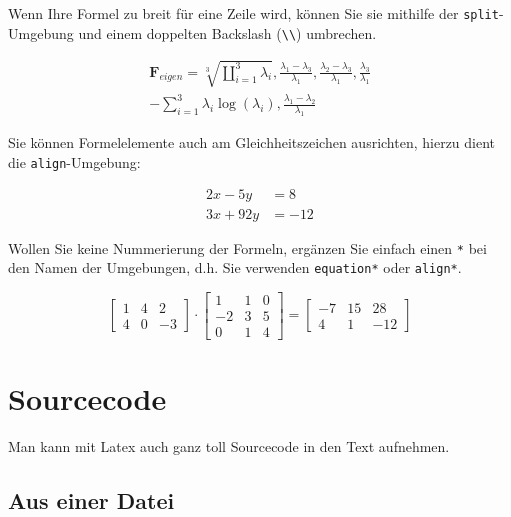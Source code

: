 Wenn Ihre Formel zu breit für eine Zeile wird, können Sie sie mithilfe der \texttt{split}-Umgebung und einem doppelten Backslash (\verb+\\+) umbrechen.

\begin{equation}
\label{eq:4}
\begin{split}
\mathbf{F}_{{eigen}}=\sqrt[3]{\coprod_{i=1}^{3} \lambda_{i}},
\frac{\lambda_{1}-\lambda_{3}}{\lambda_{1}},
\frac{\lambda_{2}-\lambda_{3}}{\lambda_{1}},
\frac{\lambda_{3}}{\lambda_{1}} \\-
\sum_{i=1}^{3} \lambda_{i} \log \left(\lambda_{i}\right),
\frac{\lambda_{1}-\lambda_{2}}{\lambda_{1}}
\end{split}
\end{equation}

Sie können Formelelemente auch am Gleichheitszeichen ausrichten, hierzu dient die \texttt{align}-Umgebung:

\begin{align}
2x - 5y &=  8 \\
3x + 92y &=  -12
\end{align}

Wollen Sie keine Nummerierung der Formeln, ergänzen Sie einfach einen \texttt{*} bei den Namen der Umgebungen, d.h. Sie verwenden \texttt{equation*} oder \texttt{align*}.

\begin{equation*}
\begin{bmatrix}
   1 &  4 &  2 \\
   4 &  0 & -3
\end{bmatrix}
        \cdot
\begin{bmatrix}
   1 &  1 &  0 \\
  -2 &  3 &  5 \\
   0 &  1 &  4
\end{bmatrix}
       {=}
\begin{bmatrix}
  -7 &  15 &  28 \\
   4 &   1 & -12
\end{bmatrix}
\end{equation*}


\section{Sourcecode}

Man kann mit Latex auch ganz toll Sourcecode in den Text aufnehmen.

\subsection{Aus einer Datei}

